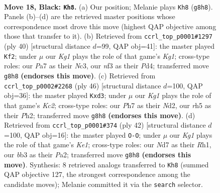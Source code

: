 \documentclass[11pt]{article}
\begin{document}
\clearpage

\begin{figure}[p]\centering
\begin{subfigure}{0.46\textwidth}\centering
\resizebox{\linewidth}{!}{%
\newchessgame
\chessboard[
  setfen={rnb1r1k1/pppnp1bp/8/P1P3PR/8/1B3N2/1P3P2/RNB1K3 b Q - 0 18},
  showmover=false,
  pgfstyle=straightmove, color=movearrow, markmove={g8-h8}
]}
\caption{}
\end{subfigure}\hfill
\begin{subfigure}{0.46\textwidth}\centering
\resizebox{\linewidth}{!}{%
\newchessgame
\chessboard[
  setfen={5rk1/1ppb1p2/1n3p1p/7r/p2PN3/P1N2P2/BP4Pb/R3R1K1 w - - 0 21},
  showmover=false,
  pgfstyle=straightmove, color=movearrow, markmove={g1-f2}
]}
\caption{}
\end{subfigure}
\\[4pt]
\begin{subfigure}{0.46\textwidth}\centering
\resizebox{\linewidth}{!}{%
\newchessgame
\chessboard[
  setfen={r3n1k1/1p2b1pp/p3b1r1/5p2/PP1B4/N1Pp2P1/2KN1P1P/R2R4 w - - 0 24},
  showmover=false,
  pgfstyle=straightmove, color=movearrow, markmove={c2-d3}
]}
\caption{}
\end{subfigure}\hfill
\begin{subfigure}{0.46\textwidth}\centering
\resizebox{\linewidth}{!}{%
\newchessgame
\chessboard[
  setfen={r4k2/p4pr1/b2Np2p/2n5/1pp1P2P/8/PP2BPP1/R3K2R w KQ - 0 22},
  showmover=false,
  pgfstyle=straightmove, color=movearrow, markmove={e1-g1}
]}
\caption{}
\end{subfigure}
\caption{\textbf{Move 18, Black: \texttt{Kh8}.} (a) Our position; Melanie plays \texttt{Kh8} (\texttt{g8h8}). Panels (b)--(d) are the retrieved master positions whose correspondence most drove this move (highest QAP objective among those that transfer to it). (b) Retrieved from \texttt{ccrl\_top\_p0001\#1297} (ply 40) [structural distance $d$=99, QAP obj=41]: the master played \texttt{Kf2}; under $\mu$ our \emph{Kg1} plays the role of that game's \emph{Kg1}; cross-type roles: our \emph{P}a7 as their \emph{N}c3, our \emph{n}f3 as their \emph{P}d4; transferred move \texttt{g8h8} \textbf{(endorses this move)}. (c) Retrieved from \texttt{ccrl\_top\_p0002\#2268} (ply 46) [structural distance $d$=100, QAP obj=36]: the master played \texttt{Kxd3}; under $\mu$ our \emph{Kg1} plays the role of that game's \emph{Kc2}; cross-type roles: our \emph{P}h7 as their \emph{N}d2, our \emph{r}h5 as their \emph{P}h2; transferred move \texttt{g8h8} \textbf{(endorses this move)}. (d) Retrieved from \texttt{ccrl\_top\_p0001\#374} (ply 42) [structural distance $d$=100, QAP obj=16]: the master played \texttt{O-O}; under $\mu$ our \emph{Kg1} plays the role of that game's \emph{Ke1}; cross-type roles: our \emph{N}d7 as their \emph{R}h1, our \emph{b}b3 as their \emph{P}a2; transferred move \texttt{g8h8} \textbf{(endorses this move)}. Synthesis: 8 retrieved analogs transferred to \texttt{Kh8} (summed QAP objective 127, the strongest correspondence among the candidate moves); Melanie committed it via the \texttt{search} selector.}
\label{fig:thought-m35}
\end{figure}
\end{document}
